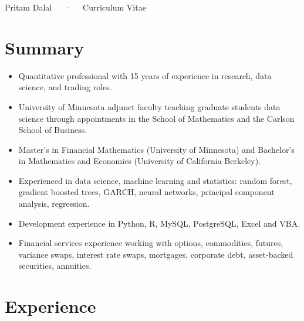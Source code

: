 \documentclass[11pt,a4paper,]{awesome-cv}
\begin{document}
\makecvheader

\makecvfooter
  {}
    {Pritam Dalal~~~·~~~Curriculum Vitae}
  {\thepage}





\hypertarget{summary}{%
\section{Summary}\label{summary}}

\begin{itemize}
\item
  Quantitative professional with 15 years of experience in research,
  data science, and trading roles.
\item
  University of Minnesota adjunct faculty teaching graduate students
  data science through appointments in the School of Mathematics and the
  Carlson School of Business.
\item
  Master's in Financial Mathematics (University of Minnesota) and
  Bachelor's in Mathematics and Economics (University of California
  Berkeley).
\item
  Experienced in data science, machine learning and statistics: random
  forest, gradient boosted trees, GARCH, neural networks, principal
  component analysis, regression.
\item
  Development experience in Python, R, MySQL, PostgreSQL, Excel and VBA.
\item
  Financial services experience working with options, commodities,
  futures, variance swaps, interest rate swaps, mortgages, corporate
  debt, asset-backed securities, annuities.
\end{itemize}

\hypertarget{experience}{%
\section{Experience}\label{experience}}
\end{document}
